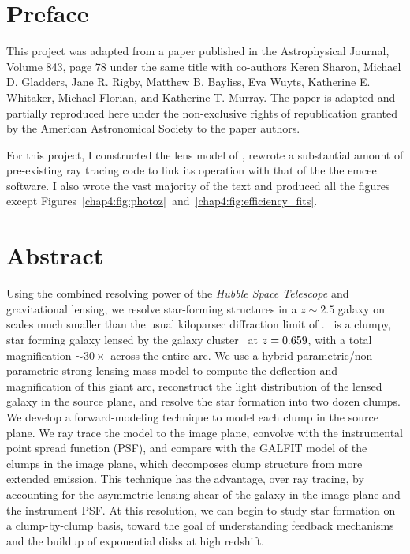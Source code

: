 \section{Preface}

This project was adapted from a paper published in the Astrophysical Journal, Volume 843, page 78 under the same title with co-authors Keren Sharon, Michael D. Gladders, Jane R. Rigby, Matthew B. Bayliss, Eva Wuyts, Katherine E. Whitaker, Michael Florian, and Katherine T. Murray. The paper is adapted and partially reproduced here under the non-exclusive rights of republication granted by the American Astronomical Society to the paper authors.

For this project, I constructed the lens model of \cluster, rewrote a substantial amount of pre-existing ray tracing code to link its operation with that of the the emcee software. I also wrote the vast majority of the text and produced all the figures except Figures~\ref{chap4:fig:photoz}~and~\ref{chap4:fig:efficiency_fits}. 

\section{Abstract}
Using the combined resolving power of the {\it Hubble Space Telescope} and gravitational lensing, we resolve star-forming structures in a $z\sim2.5$ galaxy on scales much smaller than the usual kiloparsec diffraction limit of \hst. \giantarc\ is a clumpy, star forming galaxy lensed by the galaxy cluster \cluster\ at $z=0.659$, with a total magnification $\sim30\times$ across the entire arc. We use a hybrid parametric/non-parametric strong lensing mass model to compute the deflection and magnification of this giant arc, reconstruct the light distribution of the lensed galaxy in the source plane, and resolve the star formation into two dozen clumps. We develop a forward-modeling technique to model each clump in the source plane. We ray trace the model to the image plane, convolve with the instrumental point spread function (PSF), and compare with the GALFIT model of the clumps in the image plane, which decomposes clump structure from more extended emission. This technique has the advantage, over ray tracing, by accounting for the asymmetric lensing shear of the galaxy in the image plane and the instrument PSF. At this resolution, we can begin to study star formation on a clump-by-clump basis, toward the goal of understanding feedback mechanisms and the buildup of exponential disks at high redshift.

